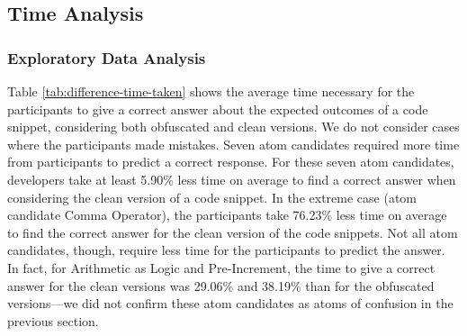 

\subsection{Time Analysis}

\subsubsection*{Exploratory Data Analysis}
Table \ref{tab:difference-time-taken} shows the average time necessary for the participants to give a correct answer about the expected outcomes of a code snippet, considering both obfuscated and clean versions. We do not consider cases where the participants made mistakes. Seven atom candidates required more time from participants to predict a correct response. For these seven atom candidates, developers take at least 5.90\% less time on average to find a correct answer when considering the clean version of a code snippet. In the extreme case (atom candidate Comma Operator), the participants take 76.23\% less
time on average to find the correct answer for the clean version of the code snippets. 
Not all atom candidates, though, require less time for the participants to predict the answer. In fact, for  Arithmetic as Logic and Pre-Increment, the time to give a correct answer for the clean versions was   
29.06\% and 38.19\% than for the obfuscated versions---we did not confirm these atom candidates as atoms of confusion in the previous section.


